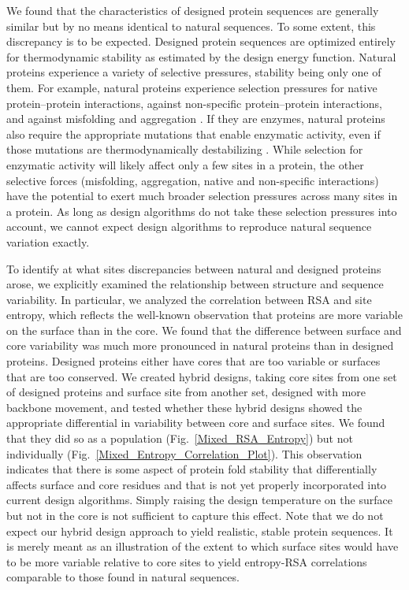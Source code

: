 \documentclass[12pt]{article}
\begin{document}
We found that the characteristics of designed protein sequences are generally similar but by no means identical to natural sequences. To some extent, this discrepancy is to be expected. Designed protein sequences are optimized entirely for thermodynamic stability as estimated by the design energy function. Natural proteins experience a variety of selective pressures, stability being only one of them. For example, natural proteins experience selection pressures for native protein--protein interactions, against non-specific protein--protein interactions, and against misfolding and aggregation  \citep{Fraser2002, Zarrinpar2003, Drummond2008, Levyetal2012}. If they are enzymes, natural proteins also require the appropriate mutations that enable enzymatic activity, even if those mutations are thermodynamically destabilizing \citep{Bloometal2006, Elcock2001}. While selection for enzymatic activity will likely affect only a few sites in a protein, the other selective forces (misfolding, aggregation, native and non-specific interactions) have the potential to exert much broader selection pressures across many sites in a protein. As long as design algorithms do not take these selection pressures into account, we cannot expect design algorithms to reproduce natural sequence variation exactly.

To identify at what sites discrepancies between natural and designed proteins arose, we explicitly examined the relationship between structure and sequence variability. In particular, we analyzed the correlation between RSA and site entropy, which reflects the well-known observation that proteins are more variable on the surface than in the core. We found that the difference between surface and core variability was much more pronounced in natural proteins than in designed proteins. Designed proteins either have cores that are too variable or surfaces that are too conserved. We created hybrid designs, taking core sites from one set of designed proteins and surface site from another set, designed with more backbone movement, and tested whether these hybrid designs showed the appropriate differential in variability between core and surface sites. We found that they did so as a population (Fig.~\ref{Mixed_RSA_Entropy}) but not individually (Fig.~\ref{Mixed_Entropy_Correlation_Plot}). This observation indicates that there is some aspect of protein fold stability that differentially affects surface and core residues and that is not yet properly incorporated into current design algorithms. Simply raising the design temperature on the surface but not in the core is not sufficient to capture this effect. {\color{blue}Note that we do not expect our hybrid design approach to yield realistic, stable protein sequences. It is merely meant as an illustration of the extent to which surface sites would have to be more variable relative to core sites to yield entropy-RSA correlations comparable to those found in natural sequences.}
\end{document}
